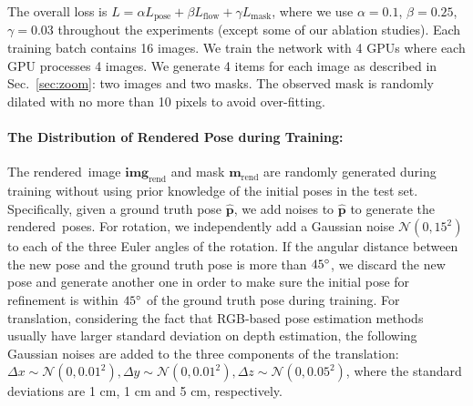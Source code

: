 \documentclass[twocolumn]{svjour3}
\newcommand{\xrend}[0]{\mathbf{img}_{\text{rend}}}
\newcommand{\mrend}[0]{\mathbf{m}_{\text{rend}}}
\newcommand{\rend}[0]{rendered}
\newcommand{\gtpose}[0]{\mathbf{\hat{p}}}
\begin{document}
The overall loss is $L = \alpha L_\text{pose} + \beta L_\text{flow} + \gamma L_\text{mask}$, where we use $\alpha = 0.1$, $\beta = 0.25$, $\gamma = 0.03$ throughout the experiments (except some of our ablation studies). Each training batch contains 16 images. We train the network with 4 GPUs where each GPU processes 4 images. We generate 4 items for each image as described in Sec.~\ref{sec:zoom}: two images and two masks. The observed mask is randomly dilated with no more than 10 pixels to avoid over-fitting.

\paragraph{The Distribution of Rendered Pose during Training:}
The \rend\ image $\xrend$ and mask $\mrend$ are randomly generated during training without using prior knowledge of the initial poses in the test set. 
Specifically, given a ground truth pose $\gtpose$, we add noises to $\gtpose$ to generate the \rend\ poses. 
For rotation, we independently add a Gaussian noise $\mathcal{N}(0, 15^2)$ to each of the three Euler angles of the rotation. If the angular distance between the new pose and the ground truth pose is more than $45\degree$, we discard the new pose and generate another one in order to make sure the initial pose for refinement is within $45\degree$ of the ground truth pose during training. 
For translation, considering the fact that RGB-based pose estimation methods usually have larger standard deviation on depth estimation, the following Gaussian noises are added to the three components of the translation: $\Delta x \sim \mathcal{N}(0, 0.01^2), \Delta y \sim \mathcal{N}(0, 0.01^2), \Delta z \sim \mathcal{N}(0, 0.05^2)$, where the standard deviations are 1 cm, 1 cm and 5 cm, respectively.



\begin{figure*}[t]
\hfill
{}
\hfill
{}
\caption{Synthetic Data for the LINEMOD, Occlusion LINEMOD and YCB-Video separately. \ref{subig.data_syn_lm} shows the synthetic training data used when training on the LINEMOD dataset, only one object is presented in the image so there is no occlusion. \ref{subfig.data_syn_occ} shows the synthetic training data used when training on the Occlusion LINEMOD dataset, multiple objects are presented in one image so one object may be occluded by other objects. \ref{subfig.data_syn_ycb} shows the synthetic training data used when training on the YCB-Video dataset. These images are rendered on the fly, so we only render two objects to maintain efficiency.}
\label{fig.data_syn}
\vspace{-4mm}
\end{figure*}
\end{document}
